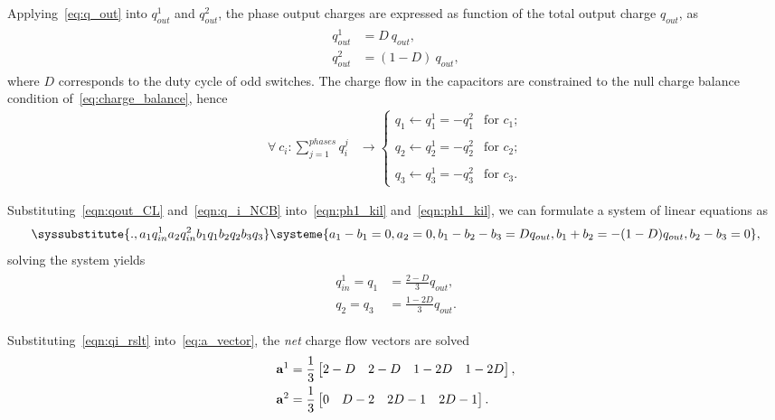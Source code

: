 Applying~\eqref{eq:q_out} into $q_{out}^1$ and $q_{out}^2$, the phase output charges are expressed as function of the total output charge $q_{out}$, as
\begin{align}
\label{eqn:qout_CL}
\begin{split}
  q_{out}^1 & = D~q_{out} ,\\
  q_{out}^2 & = (1-D)~q_{out},
\end{split}
\end{align}
where $D$ corresponds to the duty cycle of odd switches. The charge flow in the capacitors are constrained to the null charge balance condition of~\eqref{eq:charge_balance}, hence
\begin{align}
\label{eqn:q_i_NCB}
\forall~c_{i} : \sum_{j=1}^{phases}q_{i}^j & \rightarrow
    \begin{cases}
        q_1 \leftarrow q_1^1 =  - q_1^2 & \text{for } c_1;\\
        \\
        q_2 \leftarrow q_2^1 =  - q_2^2 & \text{for } c_2;\\
        \\
        q_3 \leftarrow q_3^1 =  - q_3^2 & \text{for } c_3.
    \end{cases}
\end{align}

Substituting~\eqref{eqn:qout_CL} and~\eqref{eqn:q_i_NCB} into~\eqref{eqn:ph1_kil} and~\eqref{eqn:ph1_kil}, we can formulate a system of linear equations as
\begin{equation}
  \syssubstitute{.,{a_1}{q_{in}^1}{a_2}{q_{in}^2}{b_1}{q_1}{b_2}{q_2}{b_3}{q_3}}
  \systeme{
    a_1  - b_1  = 0,
    a_2 = 0,
    b_1 - b_2  - b_3  = D q_{out},
    b_1 + b_2  =  - (1-D) q_{out},
    b_2 - b_3  = 0},
\end{equation}
solving the system yields
\begin{align}
\label{eqn:qi_rslt}
    \begin{split}
        q_{in}^1  = q_{1} & = \frac{2 -D}{3} q_{out} ,\\
        q_{2}     = q_3   & = \frac{1 - 2D}{3} q_{out}.
    \end{split}
\end{align}

Substituting~\eqref{eqn:qi_rslt} into~\eqref{eq:a_vector}, the \emph{net} charge flow vectors are solved
\begin{align}
\mathbf{a}^1 & = \frac{1}{3}\begin{bmatrix}2 - D & 2 - D & 1 - 2D & 1- 2D\end{bmatrix}, \\
\mathbf{a}^2 & = \frac{1}{3}\begin{bmatrix}0 & D - 2  & 2D -1  & 2D -1 \end{bmatrix}.
\label{eq:a_31dikson}
\end{align}

